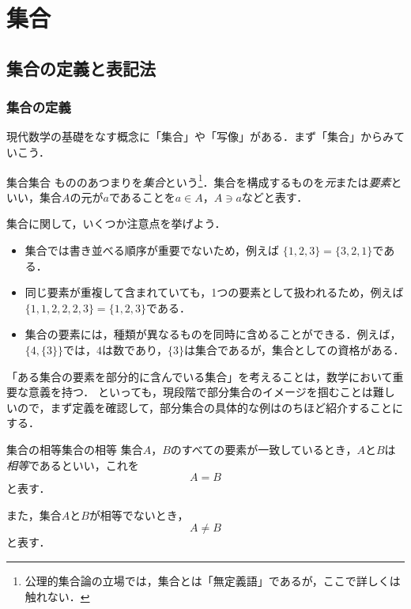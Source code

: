 \section{集合}
\subsection{集合の定義と表記法}

\subsubsection{集合の定義}

現代数学の基礎をなす概念に「集合」や「写像」がある．まず「集合」からみていこう．
\begin{definition}{集合}{集合}
  もののあつまりを\emph{集合}という\footnote{公理的集合論の立場では，集合とは「無定義語」であるが，ここで詳しくは触れない．}．集合を構成するものを\emph{元}または\emph{要素}といい，集合$A$の元が$a$であることを$a \in A$，$A \ni a$などと表す．
\end{definition}

集合に関して，いくつか注意点を挙げよう．

\begin{itemize}
  \item 集合では書き並べる順序が重要でないため，例えば $\{1, 2, 3\} = \{3, 2, 1\}$である．
  \item 同じ要素が重複して含まれていても，1つの要素として扱われるため，例えば$\{1, 1, 2, 2, 2, 3\} = \{1, 2, 3\}$である．
  \item 集合の要素には，種類が異なるものを同時に含めることができる．例えば，$\{4, \{3\}\}$では，$4$は数であり，$\{3\}$は集合であるが，集合としての資格がある．
\end{itemize}

「ある集合の要素を部分的に含んでいる集合」を考えることは，数学において重要な意義を持つ．
といっても，現段階で部分集合のイメージを掴むことは難しいので，まず定義を確認して，部分集合の具体的な例はのちほど紹介することにする．

\begin{definition}{集合の相等}{集合の相等}
  集合$A$，$B$のすべての要素が一致しているとき，$A$と$B$は\emph{相等}であるといい，これを
  \[
    A = B
  \]
  と表す．

  また，集合$A$と$B$が相等でないとき，
  \[
    A \ne B
  \]
  と表す．
\end{definition}

